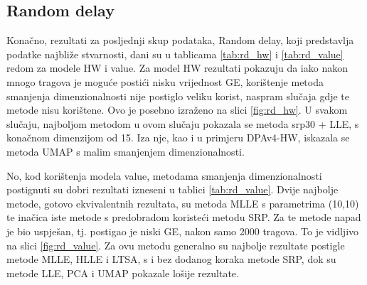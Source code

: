 \documentclass[times, utf8, diplomski]{fer}
\begin{document}
\subsection{Random delay}
Konačno, rezultati za posljednji skup podataka, Random delay, koji predstavlja podatke najbliže stvarnosti, dani su u tablicama \ref{tab:rd_hw} i \ref{tab:rd_value} redom za modele HW i value. Za model HW rezultati pokazuju da iako nakon mnogo tragova je moguće postići nisku vrijednost GE, korištenje metoda smanjenja dimenzionalnosti nije postiglo veliku korist, naspram slučaja gdje te metode nisu korištene. Ovo je posebno izraženo na slici \ref{fig:rd_hw}. U svakom slučaju, najboljom metodom u ovom slučaju pokazala se metoda srp30 + LLE, s konačnom dimenzijom od 15. Iza nje, kao i u primjeru DPAv4-HW, iskazala se metoda UMAP s malim smanjenjem dimenzionalnosti.

No, kod korištenja modela value, metodama smanjenja dimenzionalnosti postignuti su dobri rezultati izneseni u tablici \ref{tab:rd_value}. Dvije najbolje metode, gotovo ekvivalentnih rezultata, su metoda MLLE s parametrima (10,10) te inačica iste metode s predobradom koristeći metodu SRP. Za te metode napad je bio uspješan, tj. postigao je niski GE, nakon samo 2000 tragova. To je vidljivo na slici \ref{fig:rd_value}. Za ovu metodu generalno su najbolje rezultate postigle metode MLLE, HLLE i LTSA, s i bez dodanog koraka metode SRP, dok su metode LLE, PCA i UMAP pokazale lošije rezultate.
\end{document}
